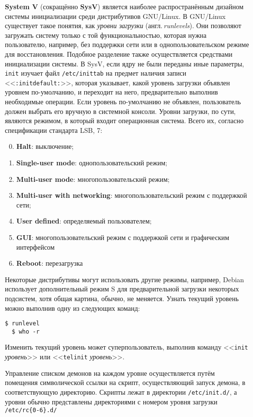  \textbf{System V} (сокращённо \textbf{SysV}) является наиболее распространённым дизайном системы инициализации среди дистрибутивов GNU/Linux. В GNU/Linux существует такое понятия, как \emph{уровни загрузки} (англ.\,\emph{run\-le\-vels}). Они позволяют загружать систему только с той функциональностью, которая нужна пользователю, например, без поддержки сети или в однопользовательском режиме для восстановления. Подобное разделение также осуществляется средствами инициализации системы.
 В SysV, если ядру не были переданы иные параметры, \texttt{init} изучает файл \texttt{/etc/inittab} на предмет наличия записи <<\texttt{:initdefault:}>>, которая указывает, какой уровень загрузки объявлен уровнем по-умол\-ча\-нию, и переходит на него, предварительно выполнив необходимые операции. Если уровень по-умолчанию не объявлен, пользователь должен выбрать его вручную в системной консоли.
 Уровни загрузки, по сути, являются режимом, в который входит операционная система. Всего их, согласно спецификации стандарта LSB, 7:
  \begin{enumerate}
   \setcounter{enumi}{-1}
   \item \textbf{Halt}: выключение;
   \item \textbf{Single-user mode}: однопользовательский режим;
   \item \textbf{Multi-user mode}: многопользовательский режим;
   \item \textbf{Multi-user with networking}: многопользовательский режим с поддержкой сети;
   \item \textbf{User defined}: определяемый пользователем;
   \item \textbf{GUI}: многопользовательский режим с поддержкой сети и графическим интерфейсом
   \item \textbf{Reboot}: перезагрузка
  \end{enumerate}
 Некоторые дистрибутивы могут использовать другие режимы, например, Debian использует дополнительный режим S для предварительной загрузки некоторых подсистем, хотя общая картина, обычно, не меняется. Узнать текущий уровень можно выполнив одну из следующих команд:
 \lstset{language=Bash}
 \begin{lstlisting}[frame=single]
  $ runlevel
  $ who -r
 \end{lstlisting}
 Изменить текущий уровень может суперпользователь, выполнив команду <<\texttt{init} \emph{уровень}>> или <<\texttt{telinit} \emph{уровень}>>.
 
 Управление списком демонов на каждом уровне осуществляется путём помещения символической ссылки на скрипт, осуществляющий запуск демона, в соответствующую директорию. Скрипты лежат в директории \texttt{/etc/init.d/}, а уровни обычно представлены директориями с номером уровня загрузки \texttt{/etc/rc\{0-6\}.d/}
 

